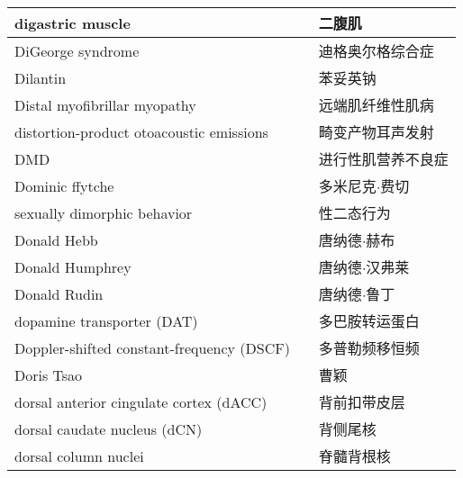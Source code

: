 \begin{longtable}{lll}
	\midrule
	digastric muscle    &&  二腹肌  \\
	
	\midrule
	DiGeorge syndrome    &&  迪格奥尔格综合症  \\
	
	\midrule
	Dilantin    &&  苯妥英钠  \\
	
	\midrule
	Distal myofibrillar myopathy    &&  远端肌纤维性肌病  \\
	
	\midrule
	distortion-product otoacoustic emissions    &&  畸变产物耳声发射  \\
	
	\midrule
	DMD    &&  进行性肌营养不良症  \\
	
	\midrule
	Dominic ffytche    &&  多米尼克$\cdot$费切  \\
	
	\midrule
	sexually dimorphic behavior    &&  性二态行为  \\
	
	\midrule
	Donald Hebb    &&  唐纳德$\cdot$赫布  \\
	
	\midrule
	Donald Humphrey    &&  唐纳德$\cdot$汉弗莱  \\
	
	\midrule
	Donald Rudin    &&  唐纳德$\cdot$鲁丁  \\
	
	\midrule
	dopamine transporter (DAT)     &&  多巴胺转运蛋白  \\
	
	\midrule
	Doppler-shifted constant-frequency (DSCF)     &&  多普勒频移恒频  \\
	
	\midrule
	Doris Tsao     &&  曹颖  \\
	
	\midrule
	dorsal anterior cingulate cortex (dACC)     &&  背前扣带皮层  \\
	
	\midrule
	dorsal caudate nucleus (dCN)     &&  背侧尾核  \\
	
	\midrule
	dorsal column nuclei  && 脊髓背根核
	\\
	

\end{longtable}
